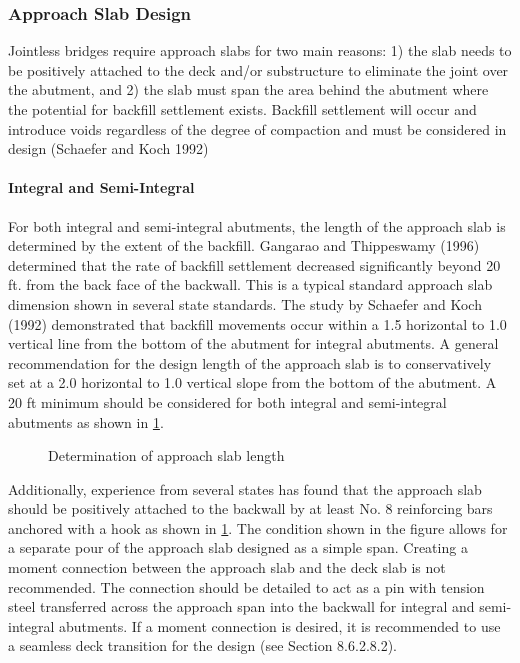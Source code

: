 \subsubsection{Approach Slab Design}
Jointless bridges require approach slabs for two main reasons: 1) the slab needs to be positively attached to the
deck and/or substructure to eliminate the joint over the abutment, and 2) the slab must span the area behind the abutment where the potential for backfill settlement exists. Backfill settlement will occur and introduce voids
regardless of the degree of compaction and must be considered in design (Schaefer and Koch 1992)

\paragraph{Integral and Semi-Integral}

For both integral and semi-integral abutments, the length of the approach slab is determined by the extent of the
backfill. Gangarao and Thippeswamy (1996) determined that the rate of backfill settlement decreased significantly
beyond 20 ft. from the back face of the backwall. This is a typical standard approach slab dimension shown in several
state standards. The study by Schaefer and Koch (1992) demonstrated that backfill movements occur within a 1.5
horizontal to 1.0 vertical line from the bottom of the abutment for integral abutments. A general recommendation for
the design length of the approach slab is to conservatively set at a 2.0 horizontal to 1.0 vertical slope from the bottom
of the abutment. A 20 ft minimum should be considered for both integral and semi-integral abutments as shown in
\cref{fig:determination-approach-slab-length}.

\begin{figure}
  \caption{Determination of approach slab length}
  \label{fig:determination-approach-slab-length}
\end{figure}

Additionally, experience from several states has found that the approach slab should be positively attached to the
backwall by at least No. 8 reinforcing bars anchored with a hook as shown in \cref{fig:determination-approach-slab-length}. The condition shown in the
figure allows for a separate pour of the approach slab designed as a simple span. Creating a moment connection
between the approach slab and the deck slab is not recommended. The connection should be detailed to act as a pin
with tension steel transferred across the approach span into the backwall for integral and semi-integral abutments. If a
moment connection is desired, it is recommended to use a seamless deck transition for the design (see Section
8.6.2.8.2).

